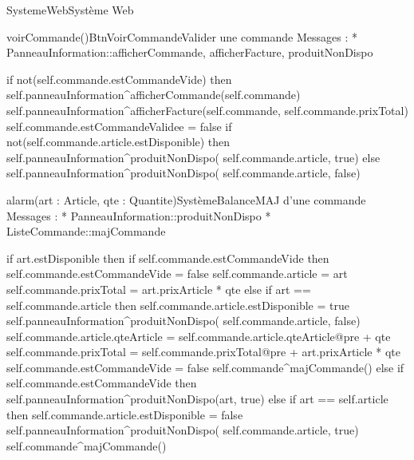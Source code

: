 \begin{OM}{SystemeWeb}{Système Web}

\begin{OMOperation}{voirCommande()}{BtnVoirCommande}{Valider une commande}
Messages :
* PanneauInformation::{afficherCommande, afficherFacture, produitNonDispo}
\begin{OMPre}
\end{OMPre}
\begin{OMPost}
        if not(self.commande.estCommandeVide) then
                self.panneauInformation^afficherCommande(self.commande)
                self.panneauInformation^afficherFacture(self.commande, self.commande.prixTotal)
                self.commande.estCommandeValidee = false
                if not(self.commande.article.estDisponible) then
                        self.panneauInformation^produitNonDispo( self.commande.article, true)
                else
                        self.panneauInformation^produitNonDispo( self.commande.article, false)
                    \end{OMPost}
\end{OMOperation}

\begin{OMOperation}{alarm(art : Article, qte : Quantite)}{SystèmeBalance}{MAJ d'une commande}
Messages :
* PanneauInformation::{produitNonDispo}
* ListeCommande::{majCommande}
\begin{OMPre}
\end{OMPre}
\begin{OMPost}
        if art.estDisponible then
                if self.commande.estCommandeVide then
                        self.commande.estCommandeVide = false
self.commande.article = art
self.commande.prixTotal = art.prixArticle * qte
                else
                        if art == self.commande.article then
                                self.commande.article.estDisponible = true
                                self.panneauInformation^produitNonDispo(
self.commande.article, false)
                                self.commande.article.qteArticle =
self.commande.article.qteArticle@pre + qte
self.commande.prixTotal = self.commande.prixTotal@pre +
art.prixArticle * qte
                        self.commande.estCommandeVide = false
                self.commande^majCommande()
        else
                if self.commande.estCommandeVide then
                        self.panneauInformation^produitNonDispo(art, true)
                else
if art == self.article then
        self.commande.article.estDisponible = false
                                self.panneauInformation^produitNonDispo(
self.commande.article, true)
                self.commande^majCommande()
            \end{OMPost}
\end{OMOperation}


\end{OM}
